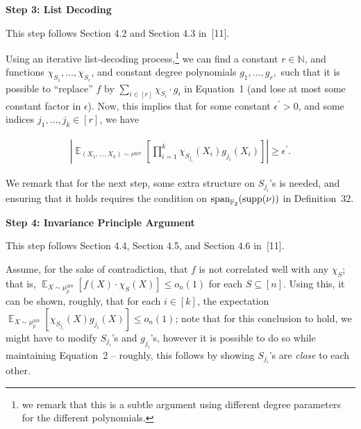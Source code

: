 \par\medskip\noindent\textbf{Step 3: List Decoding}\par




This step follows Section 4.2 and Section 4.3 in [11].\par




Using an iterative list-decoding process,\footnote{we remark that this is a subtle argument using different degree parameters for the different polynomials.} we can find a constant $r\in\mathbb{N}$, and functions $\chi_{S_{1}},\dots,\chi_{S_{r}}$, and constant degree polynomials $g_{1},\dots,g_{r},$ such that it is possible to “replace” $f$ by $\sum_{i\in[r]}\chi_{S_{i}}\cdot g_{i}$ in Equation 1 (and lose at most some constant factor in $\epsilon$).
Now, this implies that for some constant $\epsilon^{\prime}>0$, and some indices $j_{1},\dots,j_{k}\in[r]$, we have\par


\[\begin{gathered}
\left|\mathop{\mathbb{E}}_{(X_{1},\dots,X_{k})\sim\nu^{\otimes n}}\left[\prod_{i=1}^{k}\chi_{S_{j_{i}}}(X_{i})g_{j_{i}}(X_{i})\right]\right|\geqslant\epsilon^{\prime}.
\end{gathered}\]


We remark that for the next step, some extra structure on $S_{j_{i}}$’s is needed, and ensuring that it holds requires the condition on $\textnormal{span}_{\mathbb{F}_{2}}(\textnormal{supp}(\nu))$ in Definition 32.\par





\par\medskip\noindent\textbf{Step 4: Invariance Principle Argument}\par




This step follows Section 4.4, Section 4.5, and Section 4.6 in [11].\par




Assume, for the sake of contradiction, that $f$ is not correlated well with any $\chi_{S}$; that is, $\mathop{\mathbb{E}}_{X\sim\mu_{p}^{\otimes n}}\left[f(X)\cdot\chi_{S}(X)\right]\leqslant o_{n}(1)$ for each $S\subseteq[n]$.
Using this, it can be shown, roughly, that for each $i\in[k]$, the expectation $\mathop{\mathbb{E}}_{X\sim\mu_{p}^{\otimes n}}\left[\chi_{S_{j_{i}}}(X)g_{j_{i}}(X)\right]\leqslant o_{n}(1)$; note that for this conclusion to hold, we might have to modify $S_{j_{i}}$’s and $g_{j_{i}}$’s, however it is possible to do so while maintaining Equation 2 – roughly, this follows by showing $S_{j_{i}}$’s are \emph{close} to each other.\par




